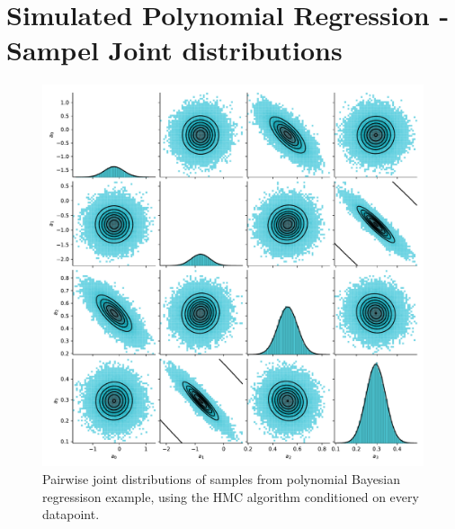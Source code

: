 \chapter{Simulated Polynomial Regression - Sampel Joint distributions} \label{apx:simulated-joint}

\begin{figure}[htbp]
    \centering
    \includegraphics[width=\linewidth]{Figures/simulated_pairs_HMC_15.pdf}
    \caption{Pairwise joint distributions of samples from polynomial Bayesian regressison example, using the HMC algorithm conditioned on every datapoint.}
    \label{fig:pairs-hmc-15}
\end{figure}

